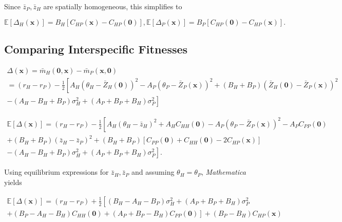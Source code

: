 \documentclass{article}
\begin{document}
Since \(\bar z_P,\bar z_H\) are spatially homogeneous, this simplifies
to

\begin{subequations}
  \begin{equation}
    \mathbb E[\Delta_H(\pmb x)] = B_H\left[C_{HP}(\pmb x) - C_{HP}(\pmb 0) \right],
  \end{equation}
  \begin{equation}
    \mathbb E[\Delta_P(\pmb x)] = B_P\left[C_{HP}(\pmb 0) - C_{HP}(\pmb x) \right].
  \end{equation}
\end{subequations}

\hypertarget{comparing-interspecific-fitnesses}{%
\subsection{Comparing Interspecific
Fitnesses}\label{comparing-interspecific-fitnesses}}

\begin{multline}
  \Delta(\pmb x) = \bar m_H(\pmb 0,\pmb x) - \bar m_P(\pmb x,\pmb 0) \\ 
    = (r_H-r_P)-\frac{1}{2}\left[A_H(\theta_H-\bar Z_H(\pmb 0))^2-A_P(\theta_P-\bar Z_P(\pmb x))^2+(B_H+B_P)(\bar Z_H(\pmb 0)-\bar Z_P(\pmb x))^2\right. \\
      -\left.(A_H-B_H+B_P)\sigma_H^2+(A_P+B_P+B_H)\sigma_P^2\right]
\end{multline}

\begin{multline}
  \mathbb E[\Delta(\pmb x)] = (r_H-r_P)-\frac{1}{2}\left[A_H(\theta_H-\bar z_H)^2+A_HC_{HH}(\pmb 0)-A_P(\theta_P-\bar Z_P(\pmb x))^2-A_PC_{PP}(\pmb 0)\right. \\
      \left. +(B_H+B_P)(\bar z_H-\bar z_P)^2+(B_H+B_P)[C_{PP}(\pmb 0) + C_{HH}(\pmb 0) - 2C_{HP}(\pmb x)]\right. \\
        \left. -(A_H-B_H+B_P)\sigma_H^2+(A_P+B_P+B_H)\sigma_P^2\right].
\end{multline}

Using equilibrium expressions for \(\bar z_H,\bar z_P\) and assuming
\(\theta_H=\theta_P\), \emph{Mathematica} yields

\begin{multline}
  \mathbb E[\Delta(\pmb x)] = (r_H-r_P) + \frac{1}{2}\left[(B_H-A_H-B_P)\sigma_H^2+(A_P+B_P+B_H)\sigma_P^2 \right. \\
      \left. + (B_P-A_H-B_H)C_{HH}(\pmb 0)+(A_P+B_P-B_H)C_{PP}(\pmb 0)\right] + (B_P-B_H)C_{HP}(\pmb x)
\end{multline}
\end{document}
